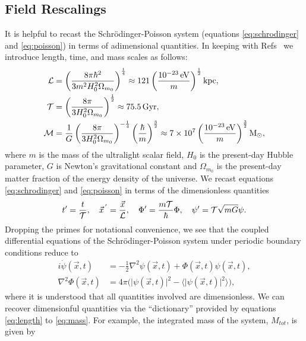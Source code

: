 \documentclass[a4paper,11pt]{article}
\begin{document}
\subsection{Field Rescalings}

It is helpful to recast the Schr{\"o}dinger-Poisson system (equations \ref{eq:schrodinger} and \ref{eq:poisson}) in terms of adimensional quantities. In keeping with Refs~\cite{Schive:2014hza,Paredes:2015wga} we introduce length, time, and mass scales as follows:
\begin{align}
    \CMcal{L}&=\left(\frac{8\pi\hbar^2}{3 m^2H_0^2\Omega_{m_0}}\right)^{\frac{1}{4}}\approx121\left(\frac{10^{-23}\operatorname{eV}}{m}\right)^{\frac{1}{2}}\operatorname{kpc},\label{eq:length}\\
    \CMcal{T}&=\left(\frac{8\pi}{3 H_0^2\Omega_{m_0}}\right)^{\frac{1}{2}}\approx75.5 \operatorname{Gyr},\label{eq:time}\\
    \CMcal{M}&=\frac{1}{G}\left(\frac{8\pi}{3 H_0^2\Omega_{m_0}}\right)^{-\frac{1}{4}}\left(\frac{\hbar}{m}\right)^{\frac{3}{2}}\approx 7\times 10^7\left(\frac{10^{-23}\operatorname{eV}}{m}\right)^{\frac{3}{2}}\operatorname{M}_{\odot},\label{eq:mass}
\end{align}
where $m$ is the mass of the ultralight scalar field, $H_0$ is the present-day Hubble parameter, $G$ is Newton's gravitational constant and $\Omega_{m_0}$ is the present-day matter fraction of the energy density of the universe. We  recast equations \ref{eq:schrodinger} and \ref{eq:poisson} in terms of the  dimensionless quantities
\begin{equation}\label{eq:dimensionless}
    t'=\frac{t}{\CMcal{T}},\quad
    \vec{x}^{\,'}=\frac{\vec{x}}{\CMcal{L}},\quad
    \Phi'=\frac{m\CMcal{T}}{\hbar}\Phi,\quad
    \psi'=\CMcal{T}\sqrt{mG}\psi.
\end{equation}
Dropping the primes for notational convenience, we see that the coupled differential equations of the  Schr{\"o}dinger-Poisson system under periodic boundary conditions reduce to 
\begin{align}
    i\Dot{\psi}(\vec{x},t)&=-\frac{1}{2}\nabla^2\psi(\vec{x},t)+\Phi(\vec{x},t)\psi(\vec{x},t),\label{eq:s-adim}\\
    \nabla^2\Phi(\vec{x},t)&=4\pi\big(\vert\psi(\vec{x},t)\vert^2-\langle\vert\psi(\vec{x},t)\vert^2\rangle\big),\label{eq:p-adim}
\end{align}
where it is understood that all quantities involved are dimensionless. We can recover  dimensionful quantities via the ``dictionary'' provided by equations \ref{eq:length} to \ref{eq:mass}. For example, the integrated mass of the system, $M_{tot}$, is given by
\end{document}
